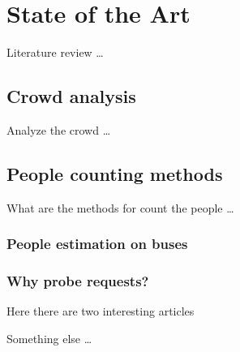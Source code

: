 \chapter{State of the Art}
\label{cha:soa}
\vspace{0.5 cm} 

Literature review \dots


\vspace{0.5 cm} 
\section{Crowd analysis}
\label{sec:crowd}
\vspace{0.5 cm} 

Analyze the crowd \dots


\vspace{0.5 cm} 
\section{People counting methods}
\label{sec:count}
\vspace{0.5 cm} 

What are the methods for count the people \dots


\vspace{0.5 cm} 
\subsection{People estimation on buses}
\label{sec:bus}
\vspace{0.5 cm}


\vspace{0.5 cm} 
\subsection{Why probe requests?}
\label{sec:probe}
\vspace{0.5 cm}

Here there are two interesting articles
\cite{mikkelsen2016public}
\cite{mehmood2019occupancy}


Something else \dots
\cite{nishide2019filter}
